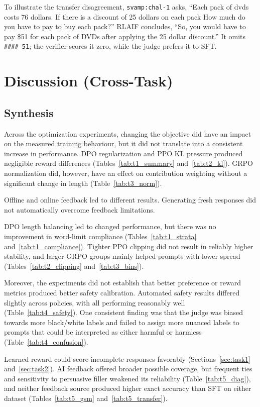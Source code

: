 \documentclass{article}
\begin{document}
To illustrate the transfer disagreement, \texttt{svamp:chal-1} asks, ``Each pack of dvds costs 76 dollars. If there is a discount of 25 dollars on each pack How much do you have to pay to buy each pack?'' RLAIF concludes, ``So, you would have to pay \$51 for each pack of DVDs after applying the 25 dollar discount.'' It omits \verb|#### 51|; the verifier scores it zero, while the judge prefers it to SFT.

\section{Discussion (Cross-Task)}
\label{sec:discussion}

\subsection{Synthesis}
Across the optimization experiments, changing the objective did have an impact on the measured training behaviour, but it did not translate into a consistent increase in performance. DPO regularization and PPO KL pressure produced negligible reward differences (Tables~\ref{tab:t1_summary} and~\ref{tab:t2_kl}). GRPO normalization did, however, have an effect on contribution weighting without a significant change in length (Table~\ref{tab:t3_norm}).

Offline and online feedback led to different results. Generating fresh responses did not automatically overcome feedback limitations.

DPO length balancing led to changed performance, but there was no improvement in word-limit compliance (Tables~\ref{tab:t1_strata} and~\ref{tab:t1_compliance}). Tighter PPO clipping did not result in reliably higher stability, and larger GRPO groups mainly helped prompts with lower spread (Tables~\ref{tab:t2_clipping} and~\ref{tab:t3_bins}).

Moreover, the experiments did not establish that better preference or reward metrics produced better safety calibration. Automated safety results differed slightly across policies, with all performing reasonably well (Table~\ref{tab:t4_safety}). One consistent finding was that the judge was biased towards more black/white labels and failed to assign more nuanced labels to prompts that could be interpreted as either harmful or harmless (Table~\ref{tab:t4_confusion}).

Learned reward could score incomplete responses favorably (Sections~\ref{sec:task1} and~\ref{sec:task2}). AI feedback offered broader possible coverage, but frequent ties and sensitivity to persuasive filler weakened its reliability (Table~\ref{tab:t5_diag}), and neither feedback source produced higher exact accuracy than SFT on either dataset (Tables~\ref{tab:t5_gsm} and~\ref{tab:t5_transfer}).
\end{document}
